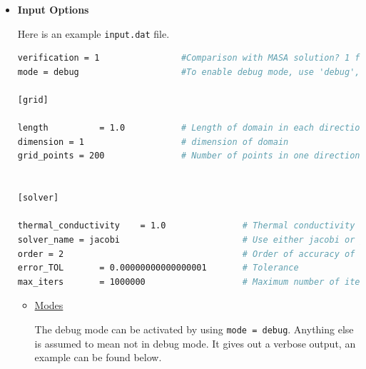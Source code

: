 \documentclass[12 pt, final]{article}
\begin{document}
\begin{itemize}
\begin{itemize}
    \texttt{.travis.yml} is a file which is responsible for CI with Travis. You will find it at the top level of the repo. You will notice that the configure commands inside the container are much easier to use than on Stampede2. (you can see the sequence of commands in this file).
    
    \texttt{README.md} This file is linked to the travis badge and it shows us if the CI tests ran properly for the latest version or not.
    
    \texttt{proj02/cover.tar.gz} has the coverage results also shown below.
    \end{itemize}
    
    \texttt{/proj02/lcov/} directory is just for the code coverage section. You do not need to worry too much about this one.
    
    \item \textbf{Input Options}


    Here is an example \texttt{input.dat} file.
    \begin{lstlisting}[language = bash, basicstyle=\tiny]
verification = 1                #Comparison with MASA solution? 1 for yes; no otherwise; Always keep as 1. Otherwise a couple of regression tests might fail.
mode = debug                    #To enable debug mode, use 'debug', anything else is normal mode.

[grid]

length			= 1.0		    # Length of domain in each direction
dimension = 1                   # dimension of domain
grid_points = 200               # Number of points in one direction


[solver]

thermal_conductivity 	= 1.0	            # Thermal conductivity k_0	 
solver_name = jacobi                        # Use either jacobi or gauss or petsc (first ensure you build with petsc)
order = 2                                   # Order of accuracy of stencil, use 2 or 4
error_TOL		= 0.00000000000000001	    # Tolerance
max_iters		= 1000000		            # Maximum number of iterations
    \end{lstlisting}
    \begin{itemize}
        \item \underline{Modes}
        
        The debug mode can be activated by using \texttt{mode = debug}. Anything else is assumed to mean not in debug mode. It gives out a verbose output, an example can be found below.
        

\end{itemize}
\end{itemize}
\end{document}

